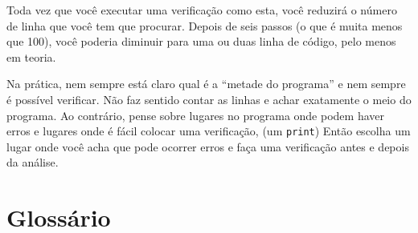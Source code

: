 Toda vez que você executar uma verificação como esta, você reduzirá o número
de linha que você tem que procurar. Depois de seis passos (o que é muita menos
que 100), você poderia diminuir para uma ou duas linha de código, pelo menos
em teoria.


Na prática, nem sempre está claro qual é a ``metade do programa'' e nem sempre
é possível verificar. Não faz sentido contar as linhas e achar exatamente o
meio do programa. Ao contrário, pense sobre lugares no programa onde podem
haver erros e lugares onde é fácil colocar uma verificação, (um {\tt print})
Então escolha um lugar onde você acha que pode ocorrer erros e faça uma
verificação antes e depois da análise.

\section{Glossário}

